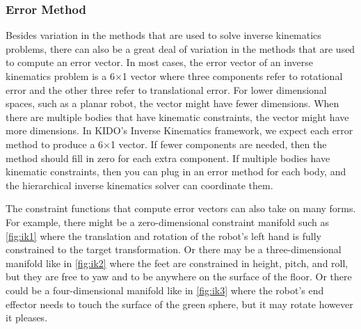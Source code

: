 \subsubsection{Error Method}
\label{sec:ErrorMethod}

Besides variation in the methods that are used to solve inverse kinematics problems, there can also be a great deal of variation in the methods that are used to compute an error vector. In most cases, the error vector of an inverse kinematics problem is a 6$\times$1 vector where three components refer to rotational error and the other three refer to translational error. For lower dimensional spaces, such as a planar robot, the vector might have fewer dimensions. When there are multiple bodies that have kinematic constraints, the vector might have more dimensions. In KIDO's Inverse Kinematics framework, we expect each error method to produce a 6$\times$1 vector. If fewer components are needed, then the method should fill in zero for each extra component. If multiple bodies have kinematic constraints, then you can plug in an error method for each body, and the hierarchical inverse kinematics solver can coordinate them.

The constraint functions that compute error vectors can also take on many forms. For example, there might be a zero-dimensional constraint manifold such as \ref{fig:ik1} where the translation and rotation of the robot's left hand is fully constrained to the target transformation. Or there may be a three-dimensional manifold like in \ref{fig:ik2} where the feet are constrained in height, pitch, and roll, but they are free to yaw and to be anywhere on the surface of the floor. Or there could be a four-dimensional manifold like in \ref{fig:ik3} where the robot's end effector needs to touch the surface of the green sphere, but it may rotate however it pleases.


